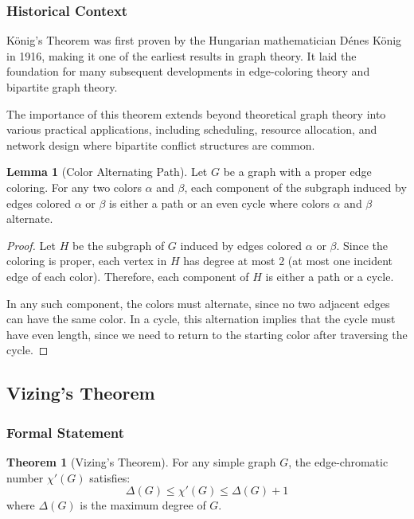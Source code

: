 \documentclass{article}
\theoremstyle{definition}
\newtheorem{theorem}{Theorem}
\newtheorem{lemma}{Lemma}
\begin{document}
\subsubsection{Historical Context}

König's Theorem was first proven by the Hungarian mathematician Dénes König in 1916, making it one of the earliest results in graph theory. It laid the foundation for many subsequent developments in edge-coloring theory and bipartite graph theory.

The importance of this theorem extends beyond theoretical graph theory into various practical applications, including scheduling, resource allocation, and network design where bipartite conflict structures are common.

\begin{lemma}[Color Alternating Path]
Let $G$ be a graph with a proper edge coloring. For any two colors $\alpha$ and $\beta$, each component of the subgraph induced by edges colored $\alpha$ or $\beta$ is either a path or an even cycle where colors $\alpha$ and $\beta$ alternate.
\end{lemma}

\begin{proof}
Let $H$ be the subgraph of $G$ induced by edges colored $\alpha$ or $\beta$. Since the coloring is proper, each vertex in $H$ has degree at most 2 (at most one incident edge of each color). Therefore, each component of $H$ is either a path or a cycle. 

In any such component, the colors must alternate, since no two adjacent edges can have the same color. In a cycle, this alternation implies that the cycle must have even length, since we need to return to the starting color after traversing the cycle.
\end{proof}

\subsection{Vizing's Theorem}

\subsubsection{Formal Statement}

\begin{theorem}[Vizing's Theorem]
For any simple graph $G$, the edge-chromatic number $\chi'(G)$ satisfies:
\begin{equation}
\Delta(G) \leq \chi'(G) \leq \Delta(G) + 1
\end{equation}
where $\Delta(G)$ is the maximum degree of $G$.
\end{theorem}
\end{document}
